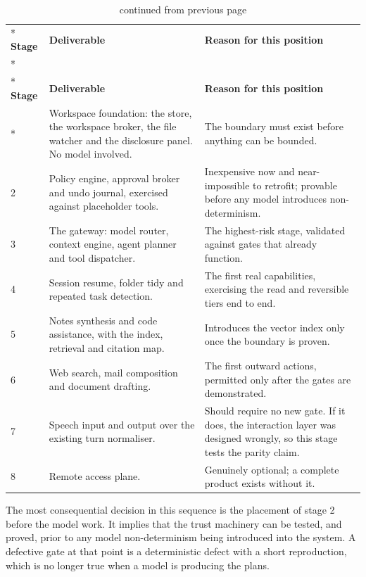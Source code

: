\documentclass{FastFyp}
\begin{document}
{
\begin{longtable}{|p{1.2cm}|p{5.6cm}|p{6.4cm}|}
\caption{The build sequence.}\label{tab:build}\\*
\hline
\textbf{Stage} & \textbf{Deliverable} & \textbf{Reason for this position} \\*
\hline
\endfirsthead
\caption[]{continued from previous page}\\*
\hline
\textbf{Stage} & \textbf{Deliverable} & \textbf{Reason for this position} \\*
\hline
\endhead
\hline
1 & Workspace foundation: the store, the workspace broker, the file watcher and the disclosure panel. No model involved. & The boundary must exist before anything can be bounded. \\
\hline
2 & Policy engine, approval broker and undo journal, exercised against placeholder tools. & Inexpensive now and near-impossible to retrofit; provable before any model introduces non-determinism. \\
\hline
3 & The gateway: model router, context engine, agent planner and tool dispatcher. & The highest-risk stage, validated against gates that already function. \\
\hline
4 & Session resume, folder tidy and repeated task detection. & The first real capabilities, exercising the read and reversible tiers end to end. \\
\hline
5 & Notes synthesis and code assistance, with the index, retrieval and citation map. & Introduces the vector index only once the boundary is proven. \\
\hline
6 & Web search, mail composition and document drafting. & The first outward actions, permitted only after the gates are demonstrated. \\
\hline
7 & Speech input and output over the existing turn normaliser. & Should require no new gate. If it does, the interaction layer was designed wrongly, so this stage tests the parity claim. \\
\hline
8 & Remote access plane. & Genuinely optional; a complete product exists without it. \\
\hline
\end{longtable}
}

The most consequential decision in this sequence is the placement of stage 2 before the model work. It implies that the trust machinery can be tested, and proved, prior to any model non-determinism being introduced into the system. A defective gate at that point is a deterministic defect with a short reproduction, which is no longer true when a model is producing the plans.
\end{document}
